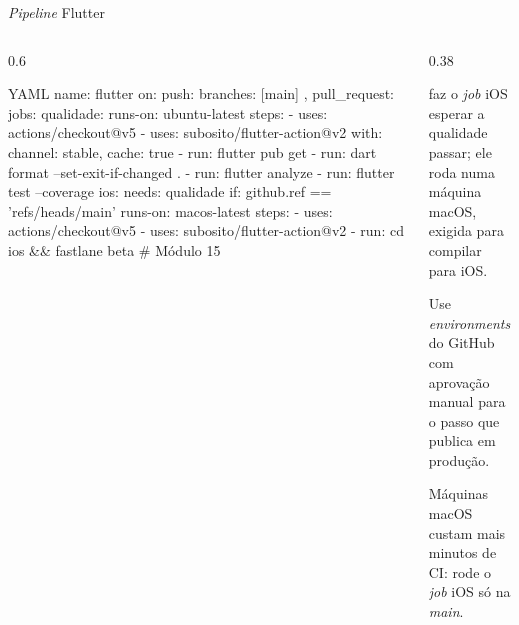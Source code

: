 \documentclass[aspectratio=169,10pt]{beamer}
\begin{document}
\begin{frame}[fragile]{\emph{Pipeline} Flutter}
  \begin{columns}[T]
    \begin{column}{0.6\textwidth}
\begin{codigo}[title=.github/workflows/flutter.yml]{YAML}
name: flutter
on: { push: { branches: [main] }, pull_request: {} }
jobs:
  qualidade:
    runs-on: ubuntu-latest
    steps:
      - uses: actions/checkout@v5
      - uses: subosito/flutter-action@v2
        with: { channel: stable, cache: true }
      - run: flutter pub get
      - run: dart format --set-exit-if-changed .
      - run: flutter analyze
      - run: flutter test --coverage
  ios:
    needs: qualidade
    if: github.ref == 'refs/heads/main'
    runs-on: macos-latest
    steps:
      - uses: actions/checkout@v5
      - uses: subosito/flutter-action@v2
      - run: cd ios && fastlane beta    # Módulo 15
\end{codigo}
    \end{column}
    \begin{column}{0.38\textwidth}
      \begin{conceito}
         faz o \emph{job} iOS esperar a qualidade passar; ele roda numa máquina macOS, exigida para compilar para iOS.
      \end{conceito}
      \begin{dica}
        Use \emph{environments} do GitHub com aprovação manual para o passo que publica em produção.
      \end{dica}
      \begin{atencao}
        Máquinas macOS custam mais minutos de CI: rode o \emph{job} iOS só na \emph{main}.
      \end{atencao}
    \end{column}
  \end{columns}
\end{frame}
\end{document}
